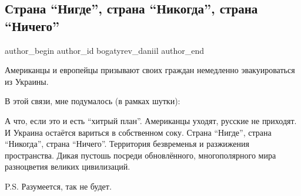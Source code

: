  
 
 
 
 
 
\subsection{Страна \enquote{Нигде}, страна \enquote{Никогда}, страна \enquote{Ничего}}
\label{sec:12_02_2022.tg.bogatyrev_daniil.1.strana_nigde}
 
\ifcmt
 author_begin
   author_id bogatyrev_daniil
 author_end
\fi

Американцы и европейцы призывают своих граждан немедленно эвакуироваться из
Украины.

В этой связи, мне подумалось (в рамках шутки): 

А что, если это и есть \enquote{хитрый план}. Американцы уходят, русские не
приходят. И Украина остаётся вариться в собственном соку. Страна
\enquote{Нигде}, страна \enquote{Никогда}, страна \enquote{Ничего}. Территория
безвременья и разжижения пространства. Дикая пустошь посреди обновлённого,
многополярного мира разноцветия великих цивилизаций.

P.S. Разумеется, так не будет.
